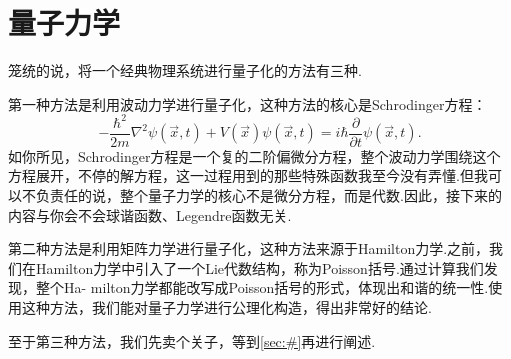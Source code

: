 \section{量子力学}\label{sec:QM}
		
    笼统的说，将一个经典物理系统进行量子化的方法有三种.
    
    第一种方法是利用波动力学进行量子化，这种方法的核心是Schrodinger方程：
    \begin{equation}
        -\frac{\hbar^2}{2m}\nabla^2\psi(\overrightarrow{x},t)+V(\overrightarrow{x})\psi(\overrightarrow{x},t)=i\hbar\frac{\partial}{\partial t}\psi(\overrightarrow{x},t).
    \end{equation}
    如你所见，Schrodinger方程是一个复的二阶偏微分方程，整个波动力学围绕这个方程展开，不停的解方程，这一过程用到的那些特殊函数我至今没有弄懂.但我可以不负责任的说，整个量子力学的核心不是微分方程，而是代数.因此，接下来的内容与你会不会球谐函数、Legendre函数无关.

    第二种方法是利用矩阵力学进行量子化，这种方法来源于Hamilton力学.之前，我们在Hamilton力学中引入了一个Lie代数结构，称为Poisson括号.通过计算我们发现，整个Ha-
    milton力学都能改写成Poisson括号的形式，体现出和谐的统一性.使用这种方法，我们能对量子力学进行公理化构造，得出非常好的结论.

    至于第三种方法，我们先卖个关子，等到\ref{sec:#}再进行阐述.

